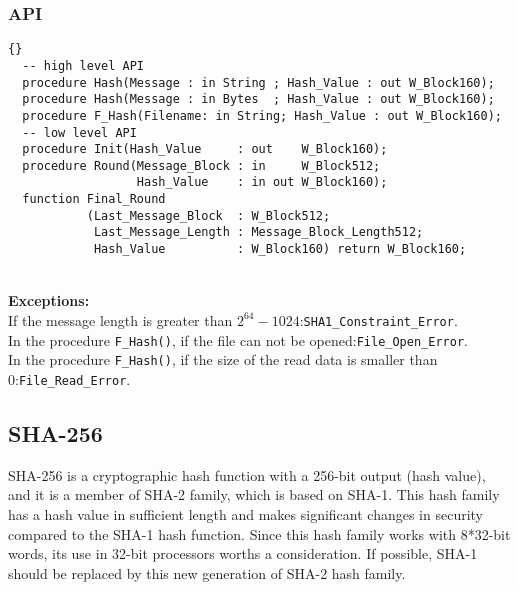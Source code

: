 \subsubsection*{API}
\begin{lstlisting}{}
  -- high level API
  procedure Hash(Message : in String ; Hash_Value : out W_Block160);
  procedure Hash(Message : in Bytes  ; Hash_Value : out W_Block160);
  procedure F_Hash(Filename: in String; Hash_Value : out W_Block160); 
  -- low level API
  procedure Init(Hash_Value     : out    W_Block160);
  procedure Round(Message_Block : in     W_Block512;
                  Hash_Value    : in out W_Block160);
  function Final_Round
           (Last_Message_Block  : W_Block512;
            Last_Message_Length : Message_Block_Length512;
            Hash_Value          : W_Block160) return W_Block160;
\end{lstlisting}\\
\textbf{Exceptions:}\\
If the message length is greater than $2^{64}-1024$:\quad \texttt{SHA1\_Constraint\_Error}.\\ 
In the procedure \texttt{F\_Hash()}, if the file can not be opened:\quad\texttt{File\_Open\_Error}.\\
In the procedure \texttt{F\_Hash()}, if the size of the read data is smaller than 0:\quad\texttt{File\_Read\_Error}.\\
\subsection{SHA-256}
SHA-256 is a cryptographic hash function with a 256-bit output (hash value), and it is a member of SHA-2 family, which is based on SHA-1. This hash family has a hash value in sufficient length and makes significant changes in security compared to the SHA-1 hash function. Since this hash family works with 8*32-bit words, its use in 32-bit processors worths a consideration. If possible, SHA-1 should be replaced by this new generation of SHA-2 hash family.
